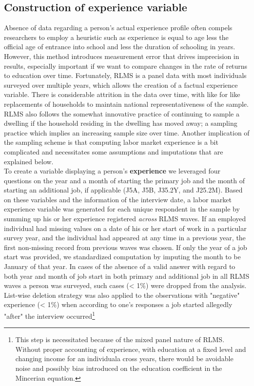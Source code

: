 \documentclass[12pt,a4paper]{article}
\numberwithin{equation}{section}
\begin{document}
\subsection{Construction of experience variable}

Absence of data regarding a person's actual experience profile often compels researchers to employ a heuristic such as experience is equal to age less the official age of entrance into school and less the duration of schooling in years. However, this method introduces measurement error that drives imprecision in results, especially important if we want to compare changes in the rate of returns to education over time. Fortunately,  RLMS is a panel data with most individuals surveyed over multiple years, which allows the creation of a factual experience variable. There is considerable attrition in the data over time, with like for like replacements of households to maintain national representativeness of the sample. RLMS also follows the somewhat innovative practice of continuing to sample a dwelling if the household residing in the dwelling has moved away; a sampling practice which implies an increasing sample size over time. Another implication of the sampling scheme is that computing labor market experience is a bit complicated and necessitates some assumptions and imputations that are explained below. \\


To create a variable displaying a person's {\bf experience} we leveraged four questions on the year and a month of starting the primary job and the month of starting an additional job, if applicable (J5A, J5B, J35.2Y, and J25.2M). Based on these variables and the information of the interview date, a labor market experience variable was generated for each unique respondent in the sample by summing up his or her experience registered \textit{across} RLMS waves. If an employed individual had missing values on a date of his or her start of work in a particular survey year, and the individual had appeared at any time in a previous year, the first non-missing record from previous waves was chosen. If only the year of a job start was provided, we standardized computation by imputing the month to be January of that year. In cases of the absence of a valid answer with regard to both year and month of job start in both primary and additional job in all RLMS waves a person was surveyed, such cases (< 1\%) were dropped from the analysis. List-wise deletion strategy was also applied to the observations with "negative" experience (< 1\%) when according to one's responses a job started allegedly "after" the interview occurred\footnote{This step is necessitated because of the mixed panel nature of RLMS. Without proper accounting of experience, with education at a fixed level and changing income for an individuala cross years, there would be avoidable noise and possibly bias introduced on the education coefficient in the Mincerian equation.} 
\\
\end{document}
